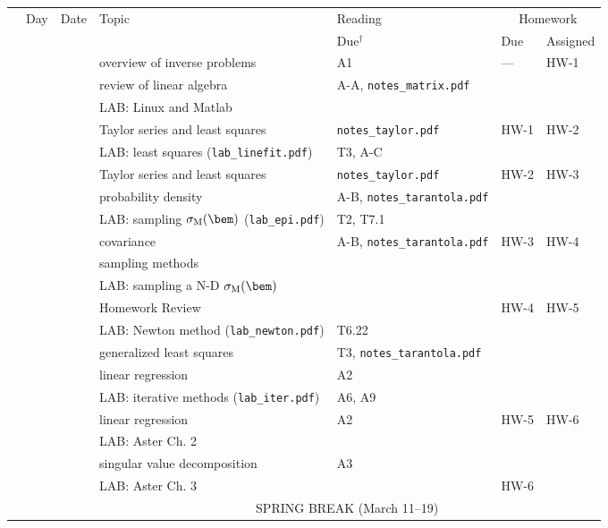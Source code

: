\documentclass[10pt,titlepage,fleqn]{article}
\begin{document}
\begin{enumerate}
\hspace{-1.5cm}
\begin{tabular}{cll|l|l|ll}
\hline
  & Day & Date & Topic & Reading & \multicolumn{2}{c}{Homework} \\
  &     &      &       & Due$^\dagger$     & Due & Assigned \\ \hline\hline
  &   &  & overview of inverse problems & A1 & --- & HW-1 \\
\hline
  &   &  & review of linear algebra & A-A, \verb+notes_matrix.pdf+ & &  \\
  &   &  & LAB: Linux and Matlab & & & \\
\hline
  &   &  & Taylor series and least squares & \verb+notes_taylor.pdf+ & HW-1 & HW-2 \\
  &   &  & LAB: least squares (\verb+lab_linefit.pdf+) & T3, A-C & & \\
\hline
  &   &  & Taylor series and least squares & \verb+notes_taylor.pdf+ & HW-2 & HW-3 \\
  &   &  & probability density & A-B, \verb+notes_tarantola.pdf+ & & \\
  &   &  & LAB: sampling $\sigma_{\rm M}(\bem)$ (\verb+lab_epi.pdf+) & T2, T7.1 & & \\
\hline
  &   &  & covariance & A-B, \verb+notes_tarantola.pdf+ & HW-3 & HW-4 \\
  &   &  & sampling methods & & & \\
  &   &  & LAB: sampling a N-D $\sigma_{\rm M}(\bem)$ & & & \\
\hline
  &   &  & Homework Review &  & HW-4 & HW-5 \\
  &   &  & LAB: Newton method (\verb+lab_newton.pdf+) & T6.22 & & \\
\hline
  &   &  & generalized least squares & T3, \verb+notes_tarantola.pdf+ & & \\
  &   &  & linear regression & A2 & & \\
  &   &  & LAB: iterative methods (\verb+lab_iter.pdf+) & A6, A9 & & \\
\hline
  &   &  & linear regression & A2 & HW-5 & HW-6 \\
  &   &  & LAB: Aster Ch. 2 & & & \\
\hline
  &   &  & singular value decomposition & A3 & & \\
  &   &  & LAB: Aster Ch. 3 & & HW-6 & \\
\hline\hline
  &   &  & \multicolumn{4}{c}{SPRING BREAK (March 11--19)} \\

\end{tabular}
\end{enumerate}
\end{document}
